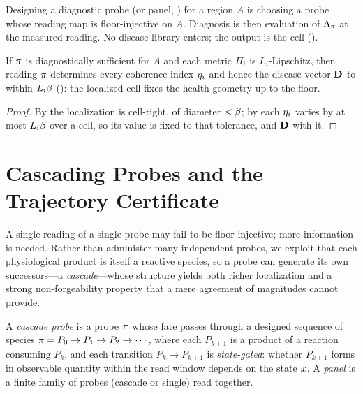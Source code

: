 \begin{corollary}
\label{cfc:cor:design}
Designing a diagnostic probe (or panel, ) for a region $A$ is
choosing a probe whose reading map is floor-injective on $A$. Diagnosis is then
evaluation of $\Lambda_\pi$ at the measured reading. No disease library enters;
the output is the cell ().
\end{corollary}

\begin{corollary}
\label{cfc:cor:coherence-from-cell}
If $\pi$ is diagnostically sufficient for $A$ and each metric $\Pi_i$ is
$L_i$-Lipschitz, then reading $\pi$ determines every coherence index
$\eta_i$ and hence the disease vector $\mathbf{D}$ to within $L_i\beta$
(): the localized cell fixes the health geometry
up to the floor.
\end{corollary}

\begin{proof}
By  the localization is cell-tight, of diameter $<\beta$;
by  each $\eta_i$ varies by at most $L_i\beta$
over a cell, so its value is fixed to that tolerance, and $\mathbf{D}$ with it.
\end{proof}

\section{Cascading Probes and the Trajectory Certificate}
\label{cfc:sec:cascade}

A single reading of a single probe may fail to be floor-injective; more
information is needed. Rather than administer many independent probes, we
exploit that each physiological product is itself a reactive species, so a
probe can generate its own successors---a \emph{cascade}---whose structure
yields both richer localization and a strong non-forgeability property that a
mere agreement of magnitudes cannot provide.

\begin{definition}
\label{cfc:def:cascade}
A \emph{cascade probe} is a probe $\pi$ whose fate passes through a designed
sequence of species $\pi=P_0\to P_1\to P_2\to\cdots$, where each $P_{k+1}$
is a product of a reaction consuming $P_k$, and each transition $P_k\to
P_{k+1}$ is \emph{state-gated}: whether $P_{k+1}$ forms in observable quantity
within the read window depends on the state $x$. A \emph{panel} is a finite
family of probes (cascade or single) read together.
\end{definition}

